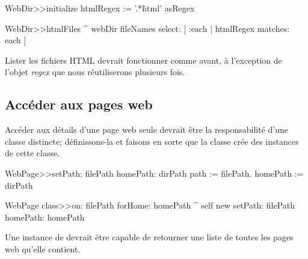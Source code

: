 \documentclass[a4paper,10pt,twoside]{book}
\begin{document}

\begin{code}{}
WebDir>>initialize
	htmlRegex := '.*\.html' asRegex

WebDir>>htmlFiles
	^ webDir fileNames select: [ :each | htmlRegex matches: each ]
\end{code}

Lister les fichiers HTML devrait fonctionner comme avant, à
l'exception de l'objet \emph{regex} que nous réutiliserons plusieurs
fois.

\subsection{Accéder aux pages web}

Accéder aux détails d'une page web seule devrait être la
responsabilité d'une classe distincte; définissons-la et faisons en
sorte que la classe  crée des instances de cette classe.


\begin{code}{}
WebPage>>setPath: filePath homePath: dirPath 
	path := filePath.
	homePath := dirPath

WebPage class>>on: filePath forHome: homePath
	^ self new setPath: filePath homePath: homePath
\end{code}

Une instance de  devrait être capable de retourner une
liste de toutes les pages web qu'elle contient.

\end{document}
